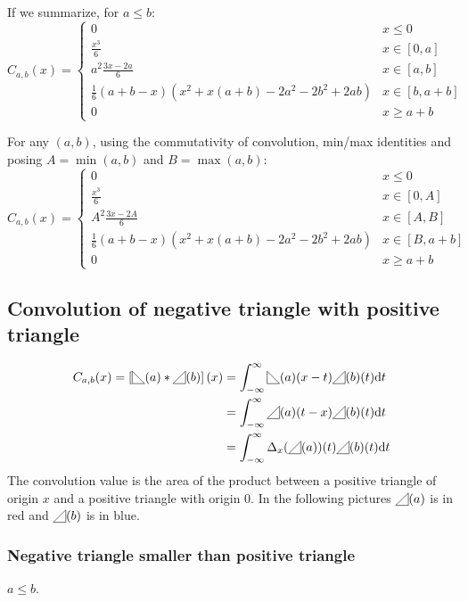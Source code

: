 \documentclass[a4paper,10pt]{article}
\newcommand\Shifted[2]{\Delta_{#1}(#2)}
\newcommand\SymPositiveTriangle{\begin{tikzpicture}[baseline=0.5ex]%
        \draw (0,0) -- (1em,0em) -- (1em,1em) -- cycle;
\end{tikzpicture}}
\newcommand\PositiveTriangle[1]{\SymPositiveTriangle(#1)}
\newcommand\SymNegativeTriangle{\begin{tikzpicture}[baseline=0.5ex]%
        \draw (0,0) -- (0,1em) -- (1em,0em) -- cycle;
\end{tikzpicture}}
\newcommand\NegativeTriangle[1]{\SymNegativeTriangle(#1)}
\newcommand\D{\mathrm{d}}
\newcommand\Convolution{\ast}
\newcommand\IntR[2]{\int_{-\infty}^{\infty}#1 \D#2}
\begin{document}
If we summarize, for $a \le b$:
\[ C_{a,b}(x) = \begin{cases}
    0 & x \le 0 \\
    \frac{x^3}{6} & x \in [0, a] \\
    a^2 \frac{3x-2a}{6} & x \in [a, b] \\
    \frac{1}{6} (a+b-x) (x^2 + x(a+b) -2a^2-2b^2+2ab) & x \in [b, a+b] \\
    0 & x \ge a+b
\end{cases} \]

For any $(a,b)$, using the commutativity of convolution, min/max identities and posing $A=\min(a,b)$ and $B=\max(a,b)$:
\[ C_{a,b}(x) = \begin{cases}
    0 & x \le 0 \\
    \frac{x^3}{6} & x \in [0, A] \\
    A^2 \frac{3x-2A}{6} & x \in [A, B] \\
    \frac{1}{6} (a+b-x) (x^2 + x(a+b) -2a^2-2b^2+2ab) & x \in [B, a+b] \\
    0 & x \ge a+b
\end{cases} \]

\subsection{Convolution of negative triangle with positive triangle}\label{proof_convolution_triangle_neg_pos}
\[ \begin{split}
    C_{a,b}(x) = \left[ \NegativeTriangle{a} \Convolution \PositiveTriangle{b} \right] (x) & = \IntR{\NegativeTriangle{a}(x-t) \PositiveTriangle{b}(t)}{t} \\
    & = \IntR{\PositiveTriangle{a}(t-x) \PositiveTriangle{b}(t)}{t} \\
    & = \IntR{\Shifted{x}{\PositiveTriangle{a}}(t) \PositiveTriangle{b}(t)}{t}
\end{split} \]
The convolution value is the area of the product between a positive triangle of origin $x$ and a positive triangle with origin $0$.
In the following pictures $\PositiveTriangle{a}$ is in red and $\PositiveTriangle{b}$ is in blue.

\subsubsection{Negative triangle smaller than positive triangle}
$a \le b$.
\end{document}
